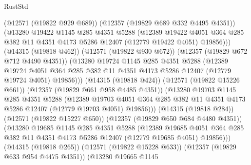 \begin{lexlean}{RustStd}
\begin{coremodule}
                  (@12571 (@19822 @929 @689))
                  (@12357 (@19829 @689 @332 @4495 @4351))
                  (@13280
                    @19422
                    @1145
                    @285
                    @4351
                    @5288
                    (@12389
                      @19422
                      @4051
                      @364
                      @285
                      @382
                      @11
                      @4351
                      @4173
                      @5286
                      @12407
                      (@12779 @19422 @4051)
                      @19856)))
                (@14315 (@19818 @462))
                (@12571 (@19822 @930 @672))
                (@12357 (@19829 @672 @712 @4490 @4351))
                (@13280
                  @19724
                  @1145
                  @285
                  @4351
                  @5288
                  (@12389
                    @19724
                    @4051
                    @364
                    @285
                    @382
                    @11
                    @4351
                    @4173
                    @5286
                    @12407
                    (@12779 @19724 @4051)
                    @19856)))
              (@14315 (@19818 @424))
              (@12571 (@19822 @15226 @661))
              (@12357 (@19829 @661 @958 @4485 @4351))
              (@13280
                @19703
                @1145
                @285
                @4351
                @5288
                (@12389
                  @19703
                  @4051
                  @364
                  @285
                  @382
                  @11
                  @4351
                  @4173
                  @5286
                  @12407
                  (@12779 @19703 @4051)
                  @19856)))
            (@14315 (@19818 @284))
            (@12571 (@19822 @15227 @650))
            (@12357 (@19829 @650 @684 @4480 @4351))
            (@13280
              @19685
              @1145
              @285
              @4351
              @5288
              (@12389
                @19685
                @4051
                @364
                @285
                @382
                @11
                @4351
                @4173
                @5286
                @12407
                (@12779 @19685 @4051)
                @19856)))
          (@14315 (@19818 @265))
          (@12571 (@19822 @15228 @633))
          (@12357 (@19829 @633 @954 @4475 @4351))
          (@13280
            @19665
            @1145

\end{coremodule}
\end{lexlean}
